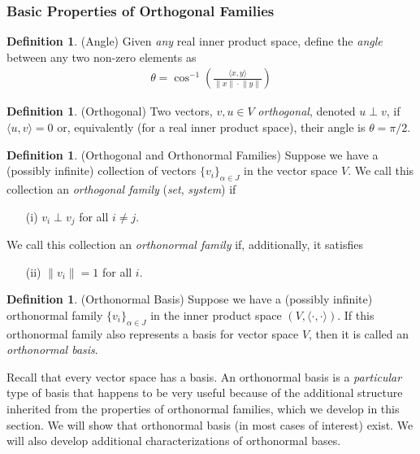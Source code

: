 \documentclass[12pt]{book}
\numberwithin{equation}{section} %
\theoremstyle{plain}
\theoremstyle{definition}
\newtheorem{defn}[thm]{Definition}
\theoremstyle{remark}
\begin{document}
\subsubsection{Basic Properties of Orthogonal Families}

\begin{defn}(Angle)
Given \emph{any} real inner product space, define the \emph{angle}
between any two non-zero elements as
\begin{align*}
  \theta = \cos^{-1}\left(
  \frac{\langle x,y \rangle}{\lVert x\rVert \cdot \lVert y \rVert}
  \right)
\end{align*}
\end{defn}

\begin{defn}(Orthogonal)
Two vectors, $v,u\in V$ \emph{orthogonal},
denoted $u\perp v$,
if $\langle u,v\rangle=0$ or,
equivalently (for a real inner product space), their angle is
$\theta=\pi/2$.
\end{defn}


\begin{defn}(Orthogonal and Orthonormal Families)
Suppose we have a (possibly infinite) collection of vectors
$\{v_i\}_{\alpha\in J}$ in
the vector space $V$.
We call this collection an \emph{orthogonal family}
(\emph{set}, \emph{system}) if
\begin{enumerate}[label=\emph{(\roman*)}]
  \item[(i)] $v_i\perp v_j$ for all $i\neq j$.
\end{enumerate}
We call this collection an \emph{orthonormal family} if,
additionally, it satisfies
\begin{enumerate}[label=\emph{(\roman*)}]
  \item[(ii)] $\lVert v_i\rVert=1$ for all $i$.
\end{enumerate}
\end{defn}

\begin{defn}(Orthonormal Basis)
Suppose we have a (possibly infinite) orthonormal family
$\{v_i\}_{\alpha\in J}$ in the inner product space
$(V,\langle\cdot,\cdot\rangle)$.
If this orthonormal family also represents a basis for vector space $V$,
then it is called an \emph{orthonormal basis}.

Recall that every vector space has a basis.
An orthonormal basis is a \emph{particular} type of basis that happens
to be very useful because of the additional structure inherited from the
properties of orthonormal families, which we develop in this section.
We will show that orthonormal basis (in most cases of interest) exist.
We will also develop additional characterizations of orthonormal bases.
\end{defn}
\end{document}
